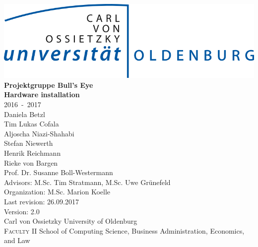 \documentclass[12pt,a4paper,twoside]{scrreprt}
\begin{document}
\pagestyle{plain}

\begin{titlepage}

		\begin{center}
		\includegraphics[scale=0.3]{LogoUniOL.png}\\[3cm]
		\Huge{\textbf{Projektgruppe Bull's Eye}}\\[0.4cm]
		\huge{\textbf{Hardware installation}}\\[0.5cm]
		\Large{2016~-~2017}\\[3ex]
		\large{
		Daniela Betzl\\
		Tim Lukas Cofala\\
		Aljoscha Niazi-Shahabi\\
		Stefan Niewerth\\
		Henrik Reichmann\\
		Rieke von Bargen\\
		}
		\vspace{1.5cm}
		\large{
				Prof. Dr. Susanne Boll-Westermann\\
				Advisors: M.Sc. Tim Stratmann, M.Sc. Uwe Gr\"unefeld\\
				Organization: M.Sc. Marion Koelle \\
				Last revision: 26.09.2017\\
				Version: 2.0\\
				Carl von Ossietzky University of Oldenburg\\
				\textsc{Faculty II } School of Computing Science, Business Administration, Economics, and Law 
			}
		\end{center}
\end{titlepage}

\listoftodos

%
\end{document}
